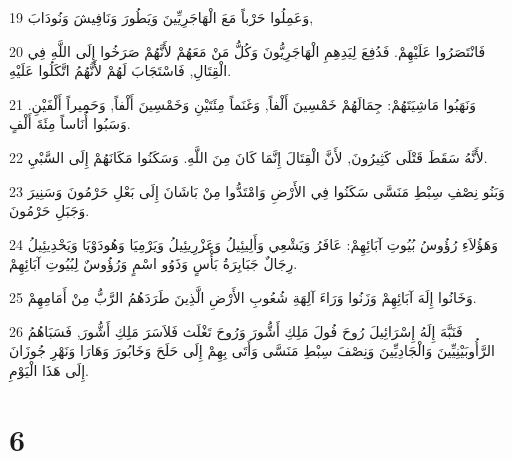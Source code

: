 \par 19 وَعَمِلُوا حَرْباً مَعَ الْهَاجَرِيِّينَ وَيَطُورَ وَنَافِيشَ وَنُودَابَ,
\par 20 فَانْتَصَرُوا عَلَيْهِمْ. فَدُفِعَ لِيَدِهِمِ الْهَاجَرِيُّونَ وَكُلُّ مَنْ مَعَهُمْ لأَنَّهُمْ صَرَخُوا إِلَى اللَّهِ فِي الْقِتَالِ, فَاسْتَجَابَ لَهُمْ لأَنَّهُمُ اتَّكَلُوا عَلَيْهِ.
\par 21 وَنَهَبُوا مَاشِيَتَهُمْ: جِمَالَهُمْ خَمْسِينَ أَلْفاً, وَغَنَماً مِئَتَيْنِ وَخَمْسِينَ أَلْفاً, وَحَمِيراً أَلْفَيْنِ. وَسَبُوا أُنَاساً مِئَةَ أَلْفٍ.
\par 22 لأَنَّهُ سَقَطَ قَتْلَى كَثِيرُونَ, لأَنَّ الْقِتَالَ إِنَّمَا كَانَ مِنَ اللَّهِ. وَسَكَنُوا مَكَانَهُمْ إِلَى السَّبْيِ.
\par 23 وَبَنُو نِصْفِ سِبْطِ مَنَسَّى سَكَنُوا فِي الأَرْضِ وَامْتَدُّوا مِنْ بَاشَانَ إِلَى بَعْلِ حَرْمُونَ وَسَنِيرَ وَجَبَلِ حَرْمُونَ.
\par 24 وَهَؤُلاَءِ رُؤُوسُ بُيُوتِ آبَائِهِمْ: عَافَرُ وَيَشْعِي وَأَلِيئِيلُ وَعَزْرِيئِيلُ وَيَرْمِيَا وَهُودَوْيَا وَيَحْدِيئِيلُ رِجَالٌ جَبَابِرَةُ بَأْسٍ وَذَوُو اسْمٍ وَرُؤُوسٌ لِبُيُوتِ آبَائِهِمْ.
\par 25 وَخَانُوا إِلَهَ آبَائِهِمْ وَزَنُوا وَرَاءَ آلِهَةِ شُعُوبِ الأَرْضِ الَّذِينَ طَرَدَهُمُ الرَّبُّ مِنْ أَمَامِهِمْ.
\par 26 فَنَبَّهَ إِلَهُ إِسْرَائِيلَ رُوحَ فُولَ مَلِكِ أَشُّورَ وَرُوحَ تَغْلَث فَلاَسَرَ مَلِكِ أَشُّورَ, فَسَبَاهُمُ الرَّأُوبَيْنِيِّينَ وَالْجَادِيِّينَ وَنِصْفَ سِبْطِ مَنَسَّى وَأَتَى بِهِمْ إِلَى حَلَحَ وَخَابُورَ وَهَارَا وَنَهْرِ جُوزَانَ إِلَى هَذَا الْيَوْمِ.

\chapter{6}

